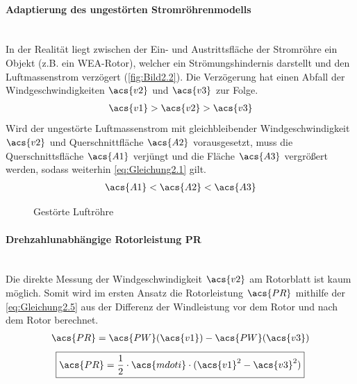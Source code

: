 \paragraph{Adaptierung des ungestörten Stromröhrenmodells}\mbox{}\smallskip\\
In der Realität liegt zwischen der Ein- und Austrittsfläche der Stromröhre ein Objekt (z.B. ein WEA-Rotor), welcher ein Strömungshindernis darstellt und den Luftmassenstrom verzögert (\autoref{fig:Bild2.2}). Die Verzögerung hat einen Abfall der Windgeschwindigkeiten $\acs{v2}$ und $\acs{v3}$ zur Folge.
\begin{align*}
    \acs{v1} > \acs{v2} > \acs{v3}
\end{align*}
\newline
Wird der ungestörte Luftmassenstrom mit gleichbleibender Windgeschwindigkeit $\acs{v2}$ und Querschnittfläche $\acs{A2}$ vorausgesetzt, muss die Querschnittsfläche $\acs{A1}$ verjüngt und die Fläche $\acs{A3}$ vergrößert werden, sodass weiterhin \autoref{eq:Gleichung2.1} gilt.
\begin{align*}
    \acs{A1} < \acs{A2} < \acs{A3}
\end{align*}
\begin{figure}[H]
   \centering
   \caption[Gestörte Luftröhre]{Gestörte Luftröhre}
   \label{fig:Bild2.2}
\end{figure}

\paragraph{Drehzahlunabhängige Rotorleistung \acs{PR}}\mbox{}\smallskip\\
Die direkte Messung der Windgeschwindigkeit $\acs{v2}$ am Rotorblatt ist kaum möglich. Somit wird im ersten Ansatz die Rotorleistung $\acs{PR}$ mithilfe der \autoref{eq:Gleichung2.5} aus der Differenz der Windleistung vor dem Rotor und nach dem Rotor berechnet.
\begin{align*} \label{eq:Gleichung2.8}
    \acs{PR} = \acs{PW}(\acs{v1}) - \acs{PW}(\acs{v3})
\end{align*}
\begin{equation}\label{eq:Gleichung2.8}
    \boxed{\acs{PR} = \frac{1}{2} \cdot \acs{mdoti} \cdot (\acs{v1}^2 - \acs{v3}^2)}
\end{equation}

